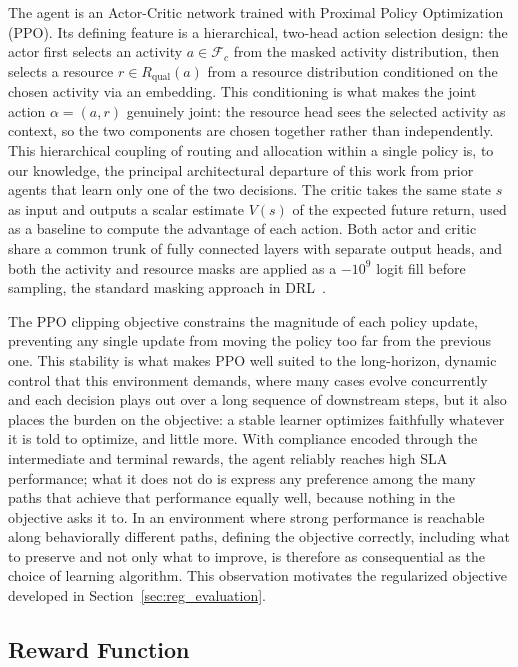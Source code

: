 \documentclass[journal,onecolumn]{IEEEtran}
\begin{document}
The agent is an Actor-Critic network trained with Proximal Policy
Optimization (PPO). Its defining feature is a hierarchical, two-head
action selection design: the actor first selects an activity
$a \in \mathcal{F}_c$ from the masked activity distribution, then
selects a resource $r \in R_{\text{qual}}(a)$ from a resource
distribution conditioned on the chosen activity via an embedding.
This conditioning is what makes the joint action $\alpha = (a, r)$
genuinely joint: the resource head sees the selected activity as
context, so the two components are chosen together rather than
independently. This hierarchical coupling of routing and allocation
within a single policy is, to our knowledge, the principal architectural
departure of this work from prior agents that learn only one of the two
decisions. The critic takes the same state $s$ as input and outputs a
scalar estimate $V(s)$ of the expected future return, used as a baseline
to compute the advantage of each action. Both actor and critic share a
common trunk of fully connected layers with separate output heads, and
both the activity and resource masks are applied as a $-10^9$ logit fill
before sampling, the standard masking approach in
DRL~\cite{Learning_policies_drl}.

The PPO clipping objective constrains the magnitude of each policy update,
preventing any single update from moving the policy too far from the previous
one. This stability is what makes PPO well suited to the long-horizon, dynamic
control that this environment demands, where many cases evolve concurrently
and each decision plays out over a long sequence of downstream steps, but it
also places the burden on the objective: a stable learner optimizes faithfully
whatever it is told to optimize, and little more. With compliance encoded
through the intermediate and terminal rewards, the agent reliably reaches high
SLA performance; what it does not do is express any preference among the many
paths that achieve that performance equally well, because nothing in the
objective asks it to. In an environment where strong performance is reachable
along behaviorally different paths, defining the objective correctly,
including what to preserve and not only what to improve, is therefore as
consequential as the choice of learning algorithm. This observation motivates
the regularized objective developed in Section~\ref{sec:reg_evaluation}.


\subsection{Reward Function}
\label{subsec:reward}
\end{document}
